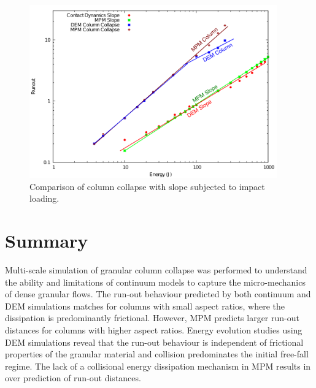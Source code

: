 \begin{figure}[tbhp]
\centering
\includegraphics[width=0.95\textwidth]{Slope_Column}
\caption{Comparison of column collapse with slope subjected to impact loading.}
\label{fig:Slope_Column}
\end{figure}

\section{Summary}
Multi-scale simulation of granular column collapse was performed to understand 
the ability and limitations of continuum models to capture the micro-mechanics 
of dense granular flows. The run-out behaviour predicted by both continuum and 
DEM simulations matches for columns with small aspect ratios, where the 
dissipation is predominantly frictional. However, MPM predicts larger run-out 
distances for columns with higher aspect ratios. Energy evolution studies using 
DEM simulations reveal that the run-out behaviour is independent of frictional 
properties of the granular material and collision predominates the initial 
free-fall regime. The lack of a collisional energy dissipation mechanism in MPM 
results in over prediction of run-out distances. 

